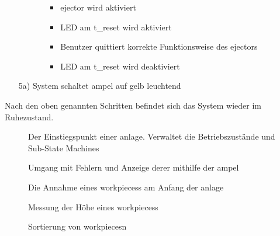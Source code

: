 \begin{enumerate}
\begin{enumerate}
\begin{enumerate}
\begin{itemize}
                \item \Gls{ejector} wird aktiviert
                \item LED am \gls{t_reset} wird aktiviert
                \item Benutzer quittiert korrekte Funktionsweise des \gls{ejector}s
                \item LED am \gls{t_reset} wird deaktiviert
            \end{itemize}
        \end{enumerate}
    \end{enumerate}
    \item[5a)] System schaltet \gls{ampel} auf gelb leuchtend
\end{enumerate}
Nach den oben genannten Schritten befindet sich das System wieder im Ruhezustand.


\begin{figure}
    \caption{Der Einstiegspunkt einer \gls{anlage}.
    Verwaltet die Betriebszustände und Sub-State Machines}
    \label{fig:stm_top_level}
\end{figure}

\begin{figure}
    \caption{Umgang mit Fehlern und Anzeige derer mithilfe der \gls{ampel}}
    \label{fig:stm_error}
\end{figure}

\begin{figure}
    \caption{Die Annahme eines \glspl{workpiece}s am Anfang der \gls{anlage}}
    \label{fig:stm_werkstueck_annahme}
\end{figure}

\begin{figure}
    \caption{Messung der Höhe eines \glspl{workpiece}s}
    \label{fig:stm_hoehe_messen}
\end{figure}

\begin{figure}
    \caption{Sortierung von \glspl{workpiece}n}
    \label{fig:stm_werkstueck_sortieren}
\end{figure}

